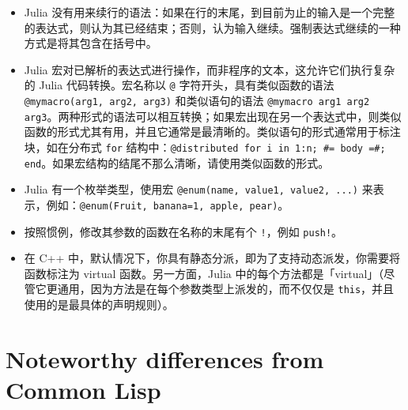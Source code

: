 \begin{itemize}
\item Julia 没有用来续行的语法：如果在行的末尾，到目前为止的输入是一个完整的表达式，则认为其已经结束；否则，认为输入继续。强制表达式继续的一种方式是将其包含在括号中。


\item Julia 宏对已解析的表达式进行操作，而非程序的文本，这允许它们执行复杂的 Julia 代码转换。宏名称以 \texttt{@} 字符开头，具有类似函数的语法 \texttt{@mymacro(arg1, arg2, arg3)} 和类似语句的语法 \texttt{@mymacro arg1 arg2 arg3}。两种形式的语法可以相互转换；如果宏出现在另一个表达式中，则类似函数的形式尤其有用，并且它通常是最清晰的。类似语句的形式通常用于标注块，如在分布式 \texttt{for} 结构中：\texttt{@distributed for i in 1:n; \#= body =\#; end}。如果宏结构的结尾不那么清晰，请使用类似函数的形式。


\item Julia 有一个枚举类型，使用宏 \texttt{@enum(name, value1, value2, ...)} 来表示，例如：\texttt{@enum(Fruit, banana=1, apple, pear)}。


\item 按照惯例，修改其参数的函数在名称的末尾有个 \texttt{!}，例如 \texttt{push!}。


\item 在 C++ 中，默认情况下，你具有静态分派，即为了支持动态派发，你需要将函数标注为 virtual 函数。另一方面，Julia 中的每个方法都是「virtual」（尽管它更通用，因为方法是在每个参数类型上派发的，而不仅仅是 \texttt{this}，并且使用的是最具体的声明规则）。

\end{itemize}


\hypertarget{14324149948761873740}{}


\section{Noteworthy differences from Common Lisp}



